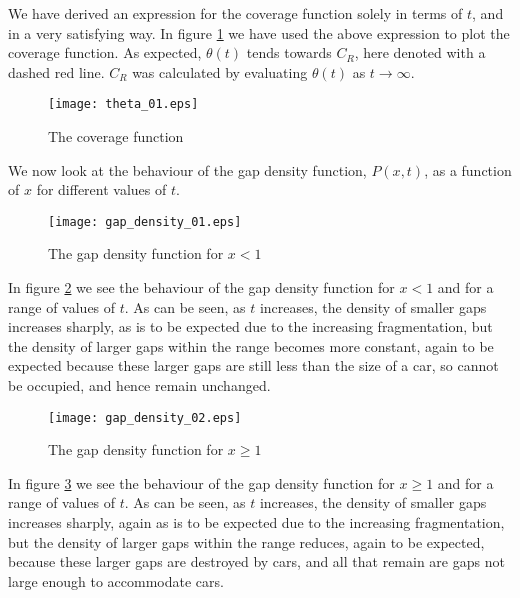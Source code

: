 We have derived an expression for the coverage function solely in terms of $t$, and in a 
very satisfying way. In figure \ref{fig:tcf1} we have used the above expression to plot 
the coverage function. As expected, $\theta(t)$ tends towards $C_R$, here denoted with a 
dashed red line. $C_R$ was calculated by evaluating $\theta(t)$ as $t \to \infty$. \bigskip

\begin{figure}[h!]
	\centering
	\texttt{[image: theta\_01.eps]}
	\caption{The coverage function}
	\label{fig:tcf1}
\end{figure}\medskip

We now look at the behaviour of the gap density function, $P(x, t)$, as a function of $x$ 
for different values of $t$. \bigskip

\begin{figure}[h!]
	\centering
	\texttt{[image: gap\_density\_01.eps]}
	\caption{The gap density function for $x < 1$}
	\label{fig:gdf1}
\end{figure}\medskip

In figure \ref{fig:gdf1} we see the behaviour of the gap density function for $x < 1$ and 
for a range of values of $t$. As can be seen, as $t$ increases, the density of smaller gaps 
increases sharply, as is to be expected due to the increasing fragmentation, but the density 
of larger gaps within the range becomes more constant, again to be expected because these 
larger gaps are still less than the size of a car, so cannot be occupied, and hence remain 
unchanged. \bigskip

\begin{figure}[h!]
	\centering
	\texttt{[image: gap\_density\_02.eps]}
	\caption{The gap density function for $x \geq 1$}
	\label{fig:gdf2}
\end{figure}\medskip

In figure \ref{fig:gdf2} we see the behaviour of the gap density function for $x \geq 1$ and 
for a range of values of $t$. As can be seen, as $t$ increases, the density of smaller gaps 
increases sharply, again as is to be expected due to the increasing fragmentation, but the 
density of larger gaps within the range reduces, again to be expected, because these larger 
gaps are destroyed by cars, and all that remain are gaps not large enough to accommodate cars. \bigskip

